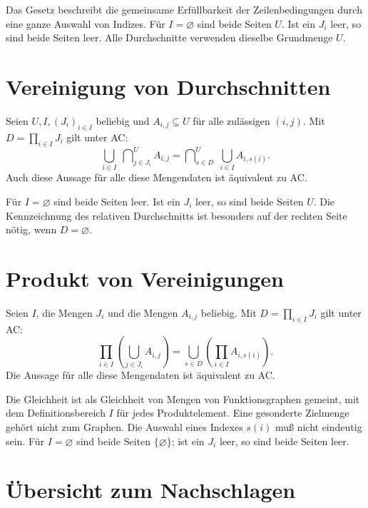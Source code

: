Das Gesetz beschreibt die gemeinsame Erfüllbarkeit der
Zeilenbedingungen durch eine ganze Auswahl von Indizes.
Für $I=\varnothing$ sind beide Seiten $U$.
Ist ein $J_i$ leer, so sind beide Seiten leer.
Alle Durchschnitte verwenden dieselbe Grundmenge $U$.

\section{Vereinigung von Durchschnitten}

\begin{theorem}
\label{b09guide:thm:dual}
Seien $U,I,(J_i)_{i\in I}$ beliebig und
$A_{i,j}\subseteq U$ für alle zulässigen $(i,j)$.
Mit $D=\prod_{i\in I}J_i$ gilt unter AC:
\[
 \boxed{\displaystyle
 \bigcup_{i\in I}\;
       \bigcap\nolimits^U_{j\in J_i}A_{i,j}
 =
 \bigcap\nolimits^U_{s\in D}\;
       \bigcup_{i\in I}A_{i,s(i)}.}
\]
Auch diese Aussage für alle diese Mengendaten ist äquivalent zu AC.
\end{theorem}

Für $I=\varnothing$ sind beide Seiten leer.
Ist ein $J_i$ leer, so sind beide Seiten $U$.
Die Kennzeichnung des relativen Durchschnitts ist besonders
auf der rechten Seite nötig, wenn $D=\varnothing$.

\section{Produkt von Vereinigungen}

\begin{theorem}
\label{b09guide:thm:productdistribution}
Seien $I$, die Mengen $J_i$ und die Mengen $A_{i,j}$ beliebig.
Mit $D=\prod_{i\in I}J_i$ gilt unter AC:
\[
 \boxed{\displaystyle
 \prod_{i\in I}\left(\bigcup_{j\in J_i}A_{i,j}\right)
 =
 \bigcup_{s\in D}\left(\prod_{i\in I}A_{i,s(i)}\right).}
\]
Die Aussage für alle diese Mengendaten ist äquivalent zu AC.
\end{theorem}

Die Gleichheit ist als Gleichheit von Mengen von Funktionsgraphen
gemeint, mit dem Definitionsbereich $I$ für jedes Produktelement.
Eine gesonderte Zielmenge gehört nicht zum Graphen.
Die Auswahl eines Indexes $s(i)$ muß nicht eindeutig sein.
Für $I=\varnothing$ sind beide Seiten $\{\varnothing\}$;
ist ein $J_i$ leer, so sind beide Seiten leer.

\section{Übersicht zum Nachschlagen}

